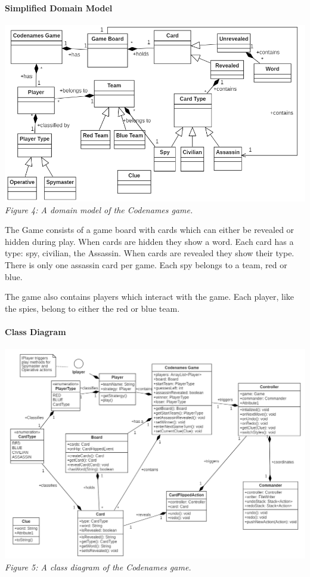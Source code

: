 \documentclass[10pt, a4paper]{article}
\begin{document}
		\paragraph{Simplified Domain Model}
			\begin{center}
				\includegraphics[scale=0.9]{Images/04_uml_domain_model.png}
				\textit{\\Figure 4: A domain model of the Codenames game. }				
			\end{center}
		The Game consists of a game board with cards which can either be revealed or hidden during play. When cards are hidden they show a word. Each card has a type: spy, civilian, the Assassin. When cards are revealed they show their type. There is only one assassin card per game. Each spy belongs to a team, red or blue. 
		
		The game also contains players which interact with the game. Each player, like the spies, belong to either the red or blue team. 
			\pagebreak
			\paragraph{Class Diagram}
				\begin{center}
				\includegraphics[scale=.60]{Images/05_uml_class_diagram.png}
				\textit{\\Figure 5: A class diagram of the Codenames game.}				
			\end{center}
			
\end{document}
